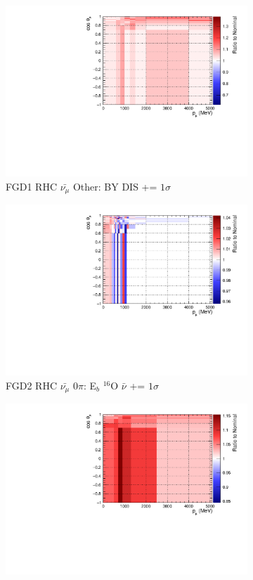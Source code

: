 \begin{figure}
\begin{subfigure}{.32\textwidth}
  \includegraphics[width=0.85\linewidth]{figs/sig/FGD1_anti-numuCC_other_CC_BY_DIS_+1sig.pdf}
  \caption{FGD1 RHC $\bar{\nu_{\mu}}$ Other: BY DIS += $1\sigma$}
  \label{fig:sigvar_FGD1_anti-numuCC_other}
\end{subfigure}
\centering
\begin{subfigure}{.32\textwidth}
  \centering
  \includegraphics[width=0.85\linewidth]{figs/sig/FGD2_anti-numuCC_0pi_EB_dial_O_nubar_+1sig.pdf}
  \caption{FGD2 RHC $\bar{\nu_{\mu}}$ 0$\pi$: E$_{b}$ $^{16}$O $\bar{\nu}$ += $1\sigma$}
  \label{fig:sigvar_FGD2_anti-numuCC_0pi}
\end{subfigure}
\begin{subfigure}{.32\textwidth}
  \centering
  \includegraphics[width=0.85\linewidth]{figs/sig/FGD2_anti-numuCC_1pi_ISO_BKG_+1sig.pdf}

\end{subfigure}
\end{figure}
